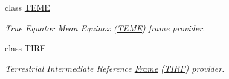 \begin{DoxyCompactItemize}
class \hyperlink{classlibrary_1_1physics_1_1coord_1_1frame_1_1provider_1_1_t_e_m_e}{T\+E\+ME}
\begin{DoxyCompactList}\small\item\em True Equator Mean Equinox (\hyperlink{classlibrary_1_1physics_1_1coord_1_1frame_1_1provider_1_1_t_e_m_e}{T\+E\+ME}) frame provider. \end{DoxyCompactList}\item 
class \hyperlink{classlibrary_1_1physics_1_1coord_1_1frame_1_1provider_1_1_t_i_r_f}{T\+I\+RF}
\begin{DoxyCompactList}\small\item\em Terrestrial Intermediate Reference \hyperlink{classlibrary_1_1physics_1_1coord_1_1_frame}{Frame} (\hyperlink{classlibrary_1_1physics_1_1coord_1_1frame_1_1provider_1_1_t_i_r_f}{T\+I\+RF}) provider. \end{DoxyCompactList}\end{DoxyCompactItemize}
